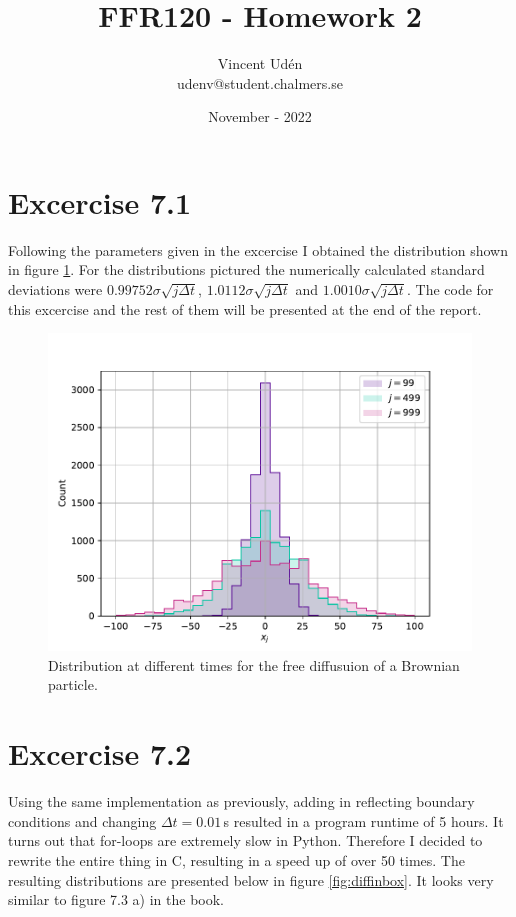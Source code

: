 \documentclass[a4paper, 12pt]{article}
\begin{document}
\title{FFR120 - Homework 2}
\author{Vincent Udén\\udenv@student.chalmers.se}
\date{November - 2022}

\maketitle

\section*{Excercise 7.1}
Following the parameters given in the excercise I obtained the distribution shown in figure \ref{fig:freediff}. For the distributions pictured the numerically calculated standard deviations were $0.99752 \sigma \sqrt{j \Delta t}$, $1.0112 \sigma \sqrt{j \Delta t}$ and $1.0010 \sigma \sqrt{j \Delta t}$. The code for this excercise and the rest of them will be presented at the end of the report.

\begin{figure}[h!]
    \centering
    \includegraphics[width=0.8\linewidth]{../Free-Diffusion/free_diff.pdf}
    \caption{Distribution at different times for the free diffusuion of a Brownian particle.}
    \label{fig:freediff}
\end{figure}

\newpage

\section*{Excercise 7.2}
Using the same implementation as previously, adding in reflecting boundary conditions and changing $\Delta t = 0.01\,$s resulted in a program runtime of 5 hours. It turns out that for-loops are extremely slow in Python. Therefore I decided to rewrite the entire thing in C, resulting in a speed up of over 50 times. The resulting distributions are presented below in figure \ref{fig:diffinbox}. It looks very similar to figure 7.3 a) in the book.
\end{document}
